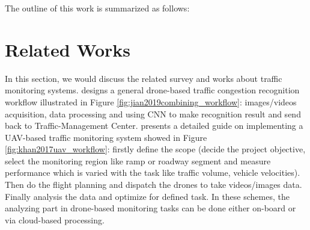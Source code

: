 \documentclass[10pt,twocolumn,letterpaper]{article}  %
\begin{document}
The outline of this work is summarized as follows:

\tableofcontents




\section{Related Works}
In this section, we would discuss the related survey and works about traffic monitoring systems. \cite{jian2019combining} designs a general drone-based traffic congestion recognition workflow illustrated in Figure \ref{fig:jian2019combining_workflow}: images/videos acquisition, data processing and using CNN to make recognition result and send back to Traffic-Management Center.
\cite{khan2017uav} presents a detailed guide on implementing a UAV-based traffic monitoring system showed in Figure \ref{fig:khan2017uav_workflow}: firstly define the scope (decide the project objective, select the monitoring region like ramp or roadway segment and measure performance which is varied with the task like traffic volume, vehicle velocities). Then do the flight planning and dispatch the drones to take videos/images data. Finally analysis the data and optimize for defined task. In these schemes, the analyzing part in drone-based monitoring tasks can be done either on-board or via cloud-based processing.
\end{document}

